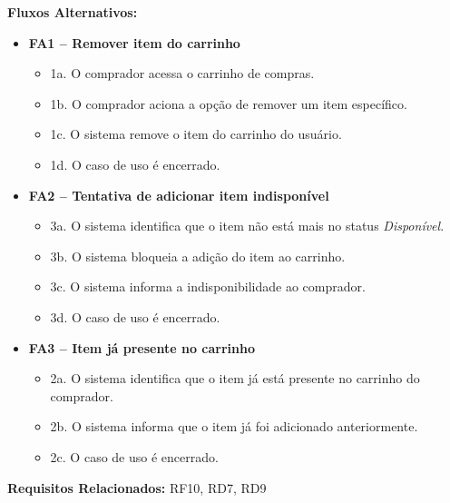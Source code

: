 \documentclass[
	article,			%
	11pt,				%
	oneside,			%
	a4paper,			%
	english,			%
	brazil,				%
	sumario=tradicional
	]{abntex2}
\begin{document}
\vspace{0.5em}
\noindent\textbf{Fluxos Alternativos:}
\begin{itemize}[leftmargin=*]
    \item \textbf{FA1 – Remover item do carrinho}
    \begin{itemize}[label={}, leftmargin=0.5cm]
        \item 1a. O comprador acessa o carrinho de compras.
        \item 1b. O comprador aciona a opção de remover um item específico.
        \item 1c. O sistema remove o item do carrinho do usuário.
        \item 1d. O caso de uso é encerrado.
    \end{itemize}
    
    \item \textbf{FA2 – Tentativa de adicionar item indisponível}
    \begin{itemize}[label={}, leftmargin=0.5cm]
        \item 3a. O sistema identifica que o item não está mais no status \textit{Disponível}.
        \item 3b. O sistema bloqueia a adição do item ao carrinho.
        \item 3c. O sistema informa a indisponibilidade ao comprador.
        \item 3d. O caso de uso é encerrado.
    \end{itemize}

    \item \textbf{FA3 – Item já presente no carrinho}
    \begin{itemize}[label={}, leftmargin=0.5cm]
        \item 2a. O sistema identifica que o item já está presente no carrinho do comprador.
        \item 2b. O sistema informa que o item já foi adicionado anteriormente.
        \item 2c. O caso de uso é encerrado.
    \end{itemize}
\end{itemize}

\vspace{0.5em}
\noindent\textbf{Requisitos Relacionados:} RF10, RD7, RD9

\end{document}
